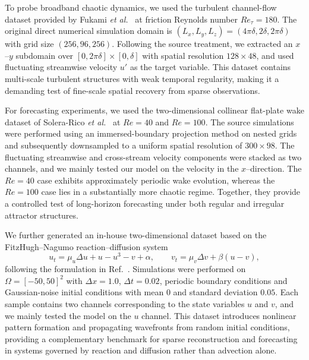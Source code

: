 \documentclass[pdflatex,sn-nature]{sn-jnl}%
\begin{document}
To probe broadband chaotic dynamics, we used the turbulent channel-flow dataset provided by Fukami \emph{et al.}~\cite{fukami2021global} at friction Reynolds number $Re_{\tau}=180$. 
The original direct numerical simulation domain is $(L_x,L_y,L_z)=(4\pi\delta,2\delta,2\pi\delta)$ with grid size $(256,96,256)$. 
Following the source treatment, we extracted an $x$--$y$ subdomain over $[0,2\pi\delta]\times[0,\delta]$ with spatial resolution $128\times48$, and used fluctuating streamwise velocity $u'$ as the target variable. 
This dataset contains multi-scale turbulent structures with weak temporal regularity, making it a demanding test of fine-scale spatial recovery from sparse observations.

For forecasting experiments, we used the two-dimensional collinear flat-plate wake dataset of Solera-Rico \emph{et al.}~\cite{SoleraRico2024} at $Re=40$ and $Re=100$. 
The source simulations were performed using an immersed-boundary projection method on nested grids and subsequently downsampled to a uniform spatial resolution of $300\times98$. 
The fluctuating streamwise and cross-stream velocity components were stacked as two channels, and we mainly tested our model on the velocity in the $x$--direction. 
The $Re=40$ case exhibits approximately periodic wake evolution, whereas the $Re=100$ case lies in a substantially more chaotic regime.
Together, they provide a controlled test of long-horizon forecasting under both regular and irregular attractor structures.

We further generated an in-house two-dimensional dataset based on the FitzHugh--Nagumo  reaction--diffusion system
\begin{equation}
u_t=\mu_u\Delta u + u-u^3-v+\alpha,\qquad
v_t=\mu_v\Delta v + \beta (u-v),
\end{equation}
following the formulation in Ref.~\cite{santos2023development}. 
Simulations were performed on $\Omega=[-50,50]^2$ with $\Delta x=1.0$, $\Delta t=0.02$, periodic boundary conditions and Gaussian-noise initial conditions with mean $0$ and standard deviation $0.05$. 
Each sample contains two channels corresponding to the state variables $u$ and $v$, and we mainly tested the model on the $u$ channel. 
This dataset introduces nonlinear pattern formation and propagating wavefronts from random initial conditions, providing a complementary benchmark for sparse reconstruction and forecasting in systems governed by reaction and diffusion rather than advection alone.
\end{document}
